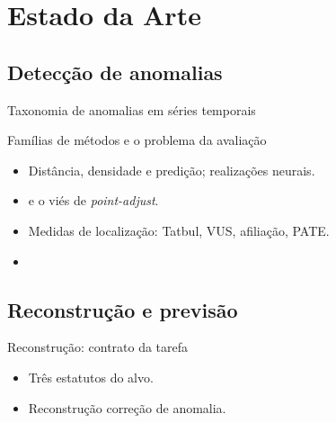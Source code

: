 
\section{Estado da Arte}

\subsection{Detecção de anomalias}

\begin{frame}{Taxonomia de anomalias em séries temporais}
\end{frame}

\begin{frame}{Famílias de métodos e o problema da avaliação}
  \begin{itemize}
    \item Distância, densidade e predição; realizações neurais.
    \item {} e o viés de \emph{point-adjust}.
    \item Medidas de localização: Tatbul, VUS, afiliação, PATE.
    \item {}
  \end{itemize}
\end{frame}

\subsection{Reconstrução e previsão}

\begin{frame}{Reconstrução: contrato da tarefa}
  \begin{itemize}
    \item Três estatutos do alvo.
    \item Reconstrução \alerta{$\neq$} correção de anomalia.
  \end{itemize}
\end{frame}

